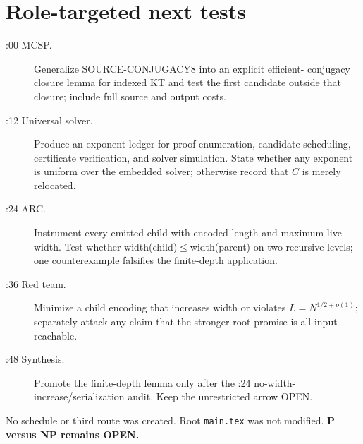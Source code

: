 \documentclass[11pt]{article}
\begin{document}
\section*{Role-targeted next tests}
\begin{description}
\item[:00 MCSP.] Generalize SOURCE-CONJUGACY8 into an explicit efficient-
conjugacy closure lemma for indexed KT and test the first candidate outside
that closure; include full source and output costs.
\item[:12 Universal solver.] Produce an exponent ledger for proof enumeration,
candidate scheduling, certificate verification, and solver simulation. State
whether any exponent is uniform over the embedded solver; otherwise record that
$C$ is merely relocated.
\item[:24 ARC.] Instrument every emitted child with encoded length and maximum
live width. Test whether width(child)$\leq$width(parent) on two recursive levels;
one counterexample falsifies the finite-depth application.
\item[:36 Red team.] Minimize a child encoding that increases width or violates
$L=N^{1/2+o(1)}$; separately attack any claim that the stronger root promise is
all-input reachable.
\item[:48 Synthesis.] Promote the finite-depth lemma only after the :24
no-width-increase/serialization audit. Keep the unrestricted arrow OPEN.
\end{description}

No schedule or third route was created. Root \texttt{main.tex} was not
modified. \textbf{P versus NP remains OPEN.}

\end{document}
